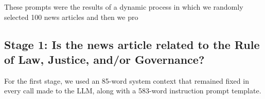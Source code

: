 \documentclass[
]{agujournal2019}
\begin{document}
These prompts were the results of a dynamic process in which we randomly
selected 100 news articles and then we pro

\subsection{Stage 1: Is the news article related to the Rule of Law,
Justice, and/or
Governance?}\label{stage-1-is-the-news-article-related-to-the-rule-of-law-justice-andor-governance}

For the first stage, we used an 85-word system context that remained
fixed in every call made to the LLM, along with a 583-word instruction
prompt template.
\end{document}

